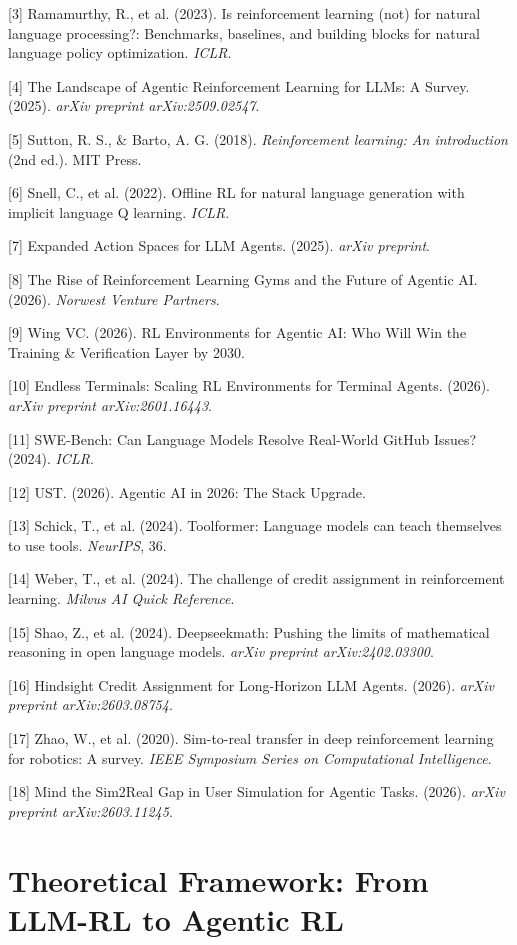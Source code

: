 [3] Ramamurthy, R., et al. (2023). Is reinforcement learning (not) for natural language processing?: Benchmarks, baselines, and building blocks for natural language policy optimization. \textit{ICLR}.

[4] The Landscape of Agentic Reinforcement Learning for LLMs: A Survey. (2025). \textit{arXiv preprint arXiv:2509.02547}.

[5] Sutton, R. S., & Barto, A. G. (2018). \textit{Reinforcement learning: An introduction} (2nd ed.). MIT Press.

[6] Snell, C., et al. (2022). Offline RL for natural language generation with implicit language Q learning. \textit{ICLR}.

[7] Expanded Action Spaces for LLM Agents. (2025). \textit{arXiv preprint}.

[8] The Rise of Reinforcement Learning Gyms and the Future of Agentic AI. (2026). \textit{Norwest Venture Partners}.

[9] Wing VC. (2026). RL Environments for Agentic AI: Who Will Win the Training & Verification Layer by 2030.

[10] Endless Terminals: Scaling RL Environments for Terminal Agents. (2026). \textit{arXiv preprint arXiv:2601.16443}.

[11] SWE-Bench: Can Language Models Resolve Real-World GitHub Issues? (2024). \textit{ICLR}.

[12] UST. (2026). Agentic AI in 2026: The Stack Upgrade.

[13] Schick, T., et al. (2024). Toolformer: Language models can teach themselves to use tools. \textit{NeurIPS}, 36.

[14] Weber, T., et al. (2024). The challenge of credit assignment in reinforcement learning. \textit{Milvus AI Quick Reference}.

[15] Shao, Z., et al. (2024). Deepseekmath: Pushing the limits of mathematical reasoning in open language models. \textit{arXiv preprint arXiv:2402.03300}.

[16] Hindsight Credit Assignment for Long-Horizon LLM Agents. (2026). \textit{arXiv preprint arXiv:2603.08754}.

[17] Zhao, W., et al. (2020). Sim-to-real transfer in deep reinforcement learning for robotics: A survey. \textit{IEEE Symposium Series on Computational Intelligence}.

[18] Mind the Sim2Real Gap in User Simulation for Agentic Tasks. (2026). \textit{arXiv preprint arXiv:2603.11245}.
\section{ Theoretical Framework: From LLM-RL to Agentic RL}


